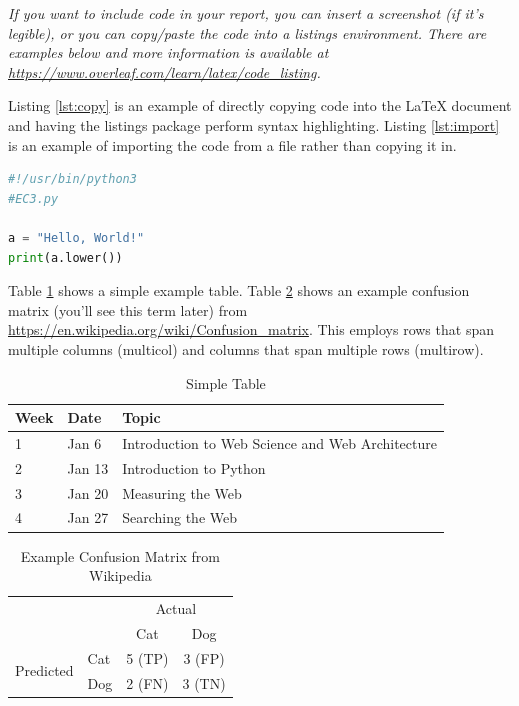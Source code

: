 \documentclass[12pt]{article}
\begin{document}
\emph{If you want to include code in your report, you can insert a screenshot (if it's legible), or you can copy/paste the code into a listings environment. There are examples below and more information is available at \url{https://www.overleaf.com/learn/latex/code_listing}.}

Listing \ref{lst:copy} is an example of directly copying code into the LaTeX document and having the listings package perform syntax highlighting. Listing \ref{lst:import} is an example of importing the code from a file rather than copying it in.

\begin{lstlisting}[language=Python, caption=Python example copied into the LaTeX, label=lst:copy]
#!/usr/bin/python3
#EC3.py

a = "Hello, World!"
print(a.lower())
\end{lstlisting}



Table \ref{tbl:simple} shows a simple example table.  Table \ref{tbl:confusion} shows an example confusion matrix (you'll see this term later) from \url{https://en.wikipedia.org/wiki/Confusion_matrix}. This employs rows that span multiple columns (multicol) and columns that span multiple rows (multirow). 

\begin{table}[h]
\centering
\caption{Simple Table}
\label{tbl:simple}
\begin{tabular}{|l|l|l|}
\hline
\textbf{Week} & \textbf{Date} & \textbf{Topic} \\ \hline \hline
1 & Jan 6 & Introduction to Web Science and Web Architecture \\ \hline
2 & Jan 13 & Introduction to Python\\ \hline
3 & Jan 20 & Measuring the Web \\ \hline
4 & Jan 27 & Searching the Web \\ \hline
\end{tabular}
\end{table}

\begin{table}[h]
\centering
\caption{Example Confusion Matrix from Wikipedia}
\label{tbl:confusion}
\begin{tabular}{l|l|c|c|}
\multicolumn{2}{c}{}&\multicolumn{2}{c}{Actual}\\
\cline{3-4}
\multicolumn{2}{c|}{}&Cat&Dog\\
\cline{2-4}
\multirow{2}{*}{Predicted}& Cat & 5 (TP) & 3 (FP)\\
\cline{2-4}
& Dog & 2 (FN) & 3 (TN) \\
\cline{2-4}
\end{tabular}
\end{table}
\end{document}
